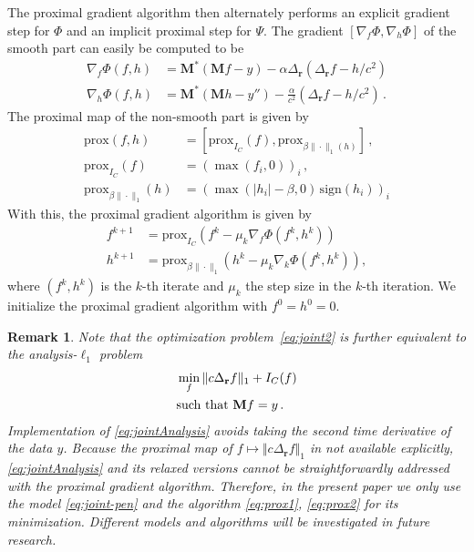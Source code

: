 \documentclass[11pt]{article}
\newcommand{\rr}{\mathbf r}
\newcommand{\data}{y}
\newcommand{\source}{f}
\newcommand{\Lsource}{h}
\newcommand\norm[1]{\Vert#1\Vert}
\newcommand{\prox}{\mathrm{prox}}
\newcommand{\sign}{\mathrm{sign}}
\newcommand{\fullop}{\mathbf M}
\newtheorem{remark}{Remark}[section]
\begin{document}
The proximal gradient  algorithm then alternately  performs an explicit gradient step
for $\Phi$ and an implicit proximal step for $\Psi$.
The gradient $[\nabla_\source \Phi, \nabla_\Lsource \Phi]$ of the  smooth part can
easily be computed  to be
\begin{align*}
	\nabla_f \Phi (f,h)
	&=  \fullop^* (\fullop \source- \data)-  \alpha \Delta_{\rr} (\Delta_{\rr} \source  -    \Lsource/c^{2})\\
	\nabla_h \Phi (f,h)
	&=   \fullop^* (\fullop \Lsource- \data'')- \frac{\alpha }{c^2}(\Delta_{\rr} \source  -    \Lsource/c^{2}) \,.
\end{align*}
The proximal map of the non-smooth part is given by
\begin{align*}
	\prox(\source,\Lsource) &= [\prox_{I_C}(\source), \prox_{\beta\|\cdot\|_1(\Lsource)}] \,,\\
	\prox_{I_C}(\source) &= (\max(\source_i,0))_i \,,\\
	\prox_{\beta\|\cdot\|_1}(h)  &= (\max(|\Lsource_i|-\beta,0)\,\sign(\Lsource_i))_i
\end{align*}
With this, the proximal gradient algorithm is given by
\begin{align} \label{eq:prox1}
	\source^{k+1} &= \prox_{I_C}\left(\source^k - \mu_k  \nabla_f \Phi (\source^k, \Lsource^k)  \right)
	\\ \label{eq:prox2}
	\Lsource^{k+1} &= \prox_{\beta\|\cdot\|_1}\left(\Lsource^k - \mu_k  \nabla_k \Phi (\source^k, \Lsource^k)\right),
\end{align}
where $(\source^k, \Lsource^k)$ is the $k$-th iterate and $\mu_k$ the step size in the $k$-th
iteration. We initialize the proximal gradient algorithm with $\source^0=\Lsource^0=0$.


\begin{remark}
	Note that the optimization problem~\eqref{eq:joint2} is further
	equivalent to the analysis-$\ell_1$ problem
	\begin{equation} \label{eq:jointAnalysis}
	\begin{aligned}
	&\min_{\source}  \norm{c\Delta_{\rr} \source}_1  +  I_{C} (\source)  \\
	&\textnormal{such that }
	\fullop\source=
	\data\,.
	\end{aligned}
	\end{equation}
	Implementation of \eqref{eq:jointAnalysis} avoids taking the second time derivative
	of the data $y$.  Because the proximal map of $\source \mapsto \norm{c\Delta_{\rr} \source}_1$
	in not available explicitly, \eqref{eq:jointAnalysis}  and its  relaxed versions
	cannot be  straightforwardly  addressed with the  proximal gradient algorithm.
	Therefore, in the present paper we only use the model \eqref{eq:joint-pen}
	and the  algorithm \eqref{eq:prox1}, \eqref{eq:prox2} for its minimization.
	Different  models and algorithms will be  investigated  in future research.
\end{remark}
\end{document}
